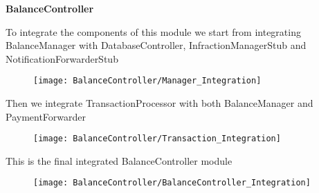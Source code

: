 \begin{Large}
\textbf{BalanceController}
\end{Large}

To integrate the components of this module we start from integrating BalanceManager with DatabaseController, InfractionManagerStub and NotificationForwarderStub
\begin{figure}[H]
\texttt{[image: BalanceController/Manager\_Integration]}
\end{figure}

Then we integrate TransactionProcessor with both BalanceManager and PaymentForwarder
\begin{figure}[H]
\texttt{[image: BalanceController/Transaction\_Integration]}
\end{figure}

This is the final integrated BalanceController module
\begin{figure}[H]
\texttt{[image: BalanceController/BalanceController\_Integration]}
\end{figure}